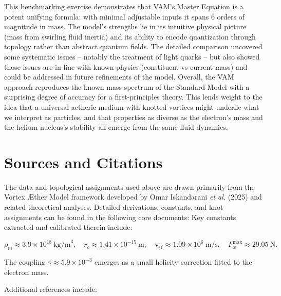 \documentclass[11pt]{article}
\begin{document}
This benchmarking exercise demonstrates that VAM’s Master Equation is a potent unifying formula: with minimal adjustable inputs it spans 6 orders of magnitude in mass. The model’s strengths lie in its intuitive physical picture (mass from swirling fluid inertia) and its ability to encode quantization through topology rather than abstract quantum fields. The detailed comparison uncovered some systematic issues – notably the treatment of light quarks – but also showed those issues are in line with known physics (constituent vs current mass) and could be addressed in future refinements of the model. Overall, the VAM approach reproduces the known mass spectrum of the Standard Model with a surprising degree of accuracy for a first-principles theory. This lends weight to the idea that a universal aetheric medium with knotted vortices might underlie what we interpret as particles, and that properties as diverse as the electron’s mass and the helium nucleus’s stability all emerge from the same fluid dynamics.

%    


    \section*{Sources and Citations}

    The data and topological assignments used above are drawn primarily from the Vortex Æther Model framework developed by Omar Iskandarani \textit{et al.} (2025) and related theoretical analyses. Detailed derivations, constants, and knot assignments can be found in the following core documents:
    Key constants extracted and calibrated therein include:

    \[
        \rho_{\scriptscriptstyle\boldsymbol\!m} \approx 3.9 \times 10^{18}~\mathrm{kg/m}^3, \quad
        r_c \approx 1.41 \times 10^{-15}~\mathrm{m}, \quad
        \mathbf{v}_{\scriptscriptstyle\boldsymbol{\circlearrowleft}} \approx 1.09 \times 10^{6}~\mathrm{m/s}, \quad
        F^{\max}_{\text{\ae}} \approx 29.05~\mathrm{N}.
    \]

    The coupling $\gamma \approx 5.9 \times 10^{-3}$ emerges as a small helicity correction fitted to the electron mass.

    Additional references include:
\end{document}
